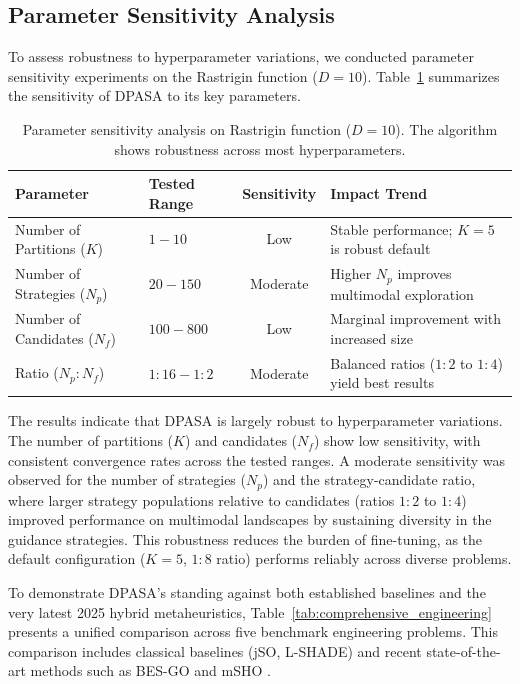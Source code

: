 \documentclass[11pt]{article}
\begin{document}
\subsection{Parameter Sensitivity Analysis}
\label{sec:sensitivity}

To assess robustness to hyperparameter variations, we conducted parameter sensitivity experiments on the Rastrigin function ($D=10$). Table~\ref{tab:sensitivity} summarizes the sensitivity of DPASA to its key parameters.

\begin{table}[ht]
\centering
\caption{Parameter sensitivity analysis on Rastrigin function ($D=10$). The algorithm shows robustness across most hyperparameters.}
\label{tab:sensitivity}
\small
\begin{tabular}{@{}llcl@{}}
\toprule
Parameter & Tested Range & Sensitivity & Impact Trend \\
\midrule
Number of Partitions ($K$) & $1 - 10$ & Low & Stable performance; $K=5$ is robust default \\
Number of Strategies ($N_p$) & $20 - 150$ & Moderate & Higher $N_p$ improves multimodal exploration \\
Number of Candidates ($N_f$) & $100 - 800$ & Low & Marginal improvement with increased size \\
Ratio ($N_p:N_f$) & $1:16 - 1:2$ & Moderate & Balanced ratios ($1:2$ to $1:4$) yield best results \\
\bottomrule
\end{tabular}
\end{table}

The results indicate that DPASA is largely robust to hyperparameter variations. The number of partitions ($K$) and candidates ($N_f$) show low sensitivity, with consistent convergence rates across the tested ranges. A moderate sensitivity was observed for the number of strategies ($N_p$) and the strategy-candidate ratio, where larger strategy populations relative to candidates (ratios $1:2$ to $1:4$) improved performance on multimodal landscapes by sustaining diversity in the guidance strategies. This robustness reduces the burden of fine-tuning, as the default configuration ($K=5$, $1:8$ ratio) performs reliably across diverse problems.




To demonstrate DPASA's standing against both established baselines and the very latest 2025 hybrid metaheuristics, Table~\ref{tab:comprehensive_engineering} presents a unified comparison across five benchmark engineering problems. This comparison includes classical baselines (jSO, L-SHADE) and recent state-of-the-art methods such as BES-GO \citep{houssein2025besgo} and mSHO \citep{hashim2024msho}.
\end{document}
